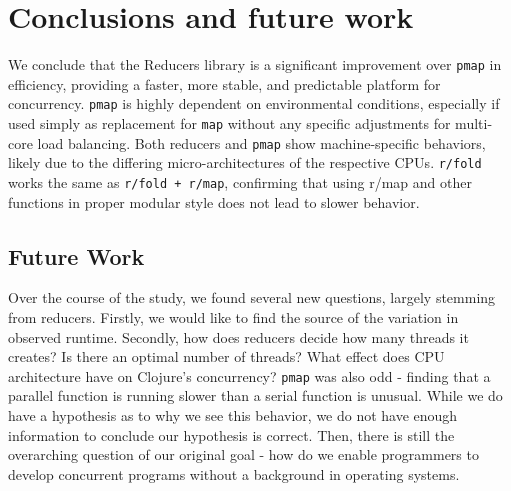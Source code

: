 \documentclass[12pt]{article}
\newcommand{\clocode}[1]{{\texttt {#1}}}
\begin{document}

\section{Conclusions and future work}\label{sec:conclusion}

We conclude that the Reducers library is a significant improvement over \clocode{pmap} in efficiency, providing a faster, more stable, and predictable platform for concurrency. \clocode{pmap} is highly dependent on environmental conditions, especially if used simply as replacement for \clocode{map} without any specific adjustments for multi-core load balancing. 
Both reducers and \clocode{pmap} show machine-specific behaviors, likely due to the differing micro-architectures of the respective CPUs. \clocode{r/fold} works the same as \clocode{r/fold + r/map}, confirming that using r/map and other functions in proper modular style does not lead to slower behavior.

\subsection{Future Work}\label{sec:future}
Over the course of the study, we found several new questions, largely stemming from reducers. Firstly, we would like to find the source of the variation in observed runtime. Secondly, how does reducers decide how many threads it creates? Is there an optimal number of threads? What effect does CPU architecture have on Clojure's concurrency? \clocode{pmap} was also odd - finding that a parallel function is running slower than a serial function is unusual. While we do have a hypothesis as to why we see this behavior, we do not have enough information to conclude our hypothesis is correct. Then, there is still the overarching question of our original goal - how do we enable programmers to develop concurrent programs without a background in operating systems.
\end{document}
